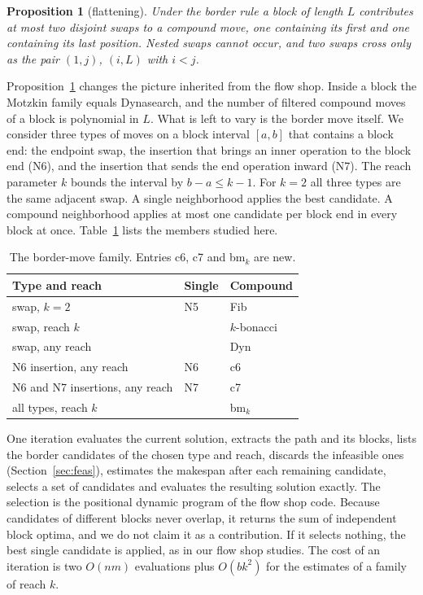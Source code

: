 \documentclass[10pt,twocolumn]{article}
\newtheorem{proposition}{Proposition}
\begin{document}
\begin{proposition}[flattening]\label{pr:flat}
Under the border rule a block of length $L$ contributes at most two
disjoint swaps to a compound move, one containing its first and one
containing its last position. Nested swaps cannot occur, and two swaps
cross only as the pair $(1,j)$, $(i,L)$ with $i<j$.
\end{proposition}

Proposition~\ref{pr:flat} changes the picture inherited from the flow
shop. Inside a block the Motzkin family equals Dynasearch, and the number
of filtered compound moves of a block is polynomial in $L$. What is left
to vary is the border move itself. We consider three types of moves on a
block interval $[a,b]$ that contains a block end: the endpoint swap, the
insertion that brings an inner operation to the block end (N6), and the
insertion that sends the end operation inward (N7). The reach parameter
$k$ bounds the interval by $b-a\le k-1$. For $k=2$ all three types are the
same adjacent swap. A single neighborhood applies the best candidate. A
compound neighborhood applies at most one candidate per block end in every
block at once. Table~\ref{tab:family} lists the members studied here.

\begin{table}[t]
\centering\small
\begin{tabular}{@{}lll@{}}
\toprule
Type and reach & Single & Compound \\
\midrule
swap, $k=2$ & N5 & Fib \\
swap, reach $k$ & & $k$-bonacci \\
swap, any reach & & Dyn \\
N6 insertion, any reach & N6 & c6 \\
N6 and N7 insertions, any reach & N7 & c7 \\
all types, reach $k$ & & bm$_k$ \\
\bottomrule
\end{tabular}
\caption{The border-move family. Entries c6, c7 and bm$_k$ are new.}
\label{tab:family}
\end{table}

One iteration evaluates the current solution, extracts the path and its
blocks, lists the border candidates of the chosen type and reach, discards
the infeasible ones (Section~\ref{sec:feas}), estimates the makespan after
each remaining candidate, selects a set of candidates and evaluates the
resulting solution exactly. The selection is the positional dynamic
program of the flow shop code. Because candidates of different blocks
never overlap, it returns the sum of independent block optima, and we do
not claim it as a contribution. If it selects nothing, the best single
candidate is applied, as in our flow shop studies. The cost of an
iteration is two $O(nm)$ evaluations plus $O(bk^2)$ for the estimates of a
family of reach $k$.
\end{document}
